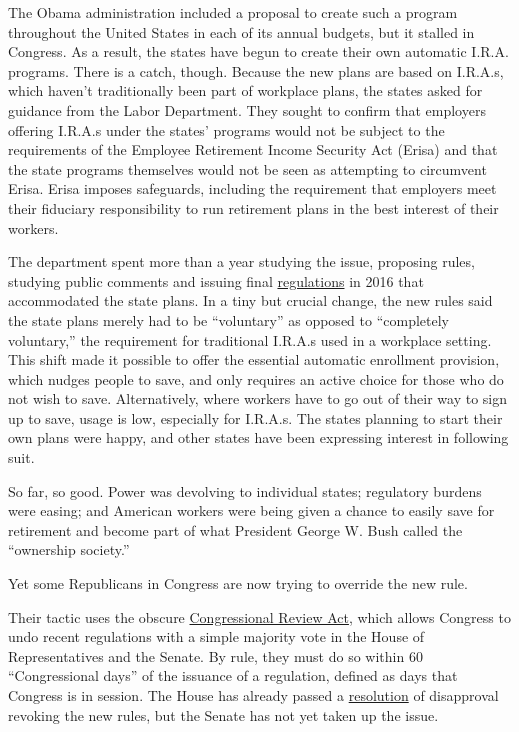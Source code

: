 The Obama administration included a proposal to create such a program
throughout the United States in each of its annual budgets, but it
stalled in Congress. As a result, the states have begun to create their
own automatic I.R.A. programs. There is a catch, though. Because the new
plans are based on I.R.A.s, which haven't traditionally been part of
workplace plans, the states asked for guidance from the Labor
Department. They sought to confirm that employers offering I.R.A.s under
the states' programs would not be subject to the requirements of the
Employee Retirement Income Security Act (Erisa) and that the state
programs themselves would not be seen as attempting to circumvent Erisa.
Erisa imposes safeguards, including the requirement that employers meet
their fiduciary responsibility to run retirement plans in the best
interest of their workers.

The department spent more than a year studying the issue, proposing
rules, studying public comments and issuing final
\href{https://www.federalregister.gov/documents/2016/08/30/2016-20639/savings-arrangements-established-by-states-for-non-governmental-employees}{regulations}
in 2016 that accommodated the state plans. In a tiny but crucial change,
the new rules said the state plans merely had to be ``voluntary'' as
opposed to ``completely voluntary,'' the requirement for traditional
I.R.A.s used in a workplace setting. This shift made it possible to
offer the essential automatic enrollment provision, which nudges people
to save, and only requires an active choice for those who do not wish to
save. Alternatively, where workers have to go out of their way to sign
up to save, usage is low, especially for I.R.A.s. The states planning to
start their own plans were happy, and other states have been expressing
interest in following suit.

So far, so good. Power was devolving to individual states; regulatory
burdens were easing; and American workers were being given a chance to
easily save for retirement and become part of what President George W.
Bush called the ``ownership society.''

Yet some Republicans in Congress are now trying to override the new
rule.

Their tactic uses the obscure
\href{https://www.nytimes3xbfgragh.onion/2017/01/30/us/politics/congressional-review-act-obama-regulations.html?_r=0}{Congressional
Review Act}, which allows Congress to undo recent regulations with a
simple majority vote in the House of Representatives and the Senate. By
rule, they must do so within 60 ``Congressional days'' of the issuance
of a regulation, defined as days that Congress is in session. The House
has already passed a
\href{https://www.congress.gov/bill/115th-congress/house-joint-resolution/66/text}{resolution}
of disapproval revoking the new rules, but the Senate has not yet taken
up the issue.

